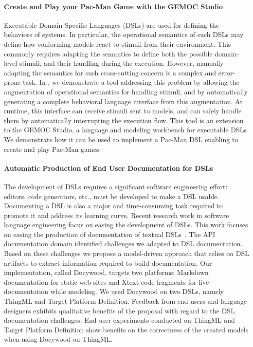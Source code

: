 \paragraph{Create and Play your Pac-Man Game with the GEMOC Studio}

Executable Domain-Specific Languages (DSLs) are used for defining the behaviors of systems. In particular, the
operational semantics of such DSLs may define how conforming
models react to stimuli from their environment. This commonly
requires adapting the semantics to define both the possible
domain-level stimuli, and their handling during the execution.
However, manually adapting the semantics for such cross-cutting
concern is a complex and error-prone task. In \cite{}, we
demonstrate a tool addressing this problem by allowing the
augmentation of operational semantics for handling stimuli, and
by automatically generating a complete behavioral language
interface from this augmentation. At runtime, this interface can receive stimuli sent to models, and can safely handle them by automatically interrupting the execution flow. This tool is an extension to the GEMOC Studio, a language and modeling
workbench for executable DSLs We demonstrate how it can be
used to implement a Pac-Man DSL enabling to create and play
Pac-Man games.



\paragraph{Automatic Production of End User Documentation for DSLs}

The development of DSLs requires a significant software engineering effort: editors, code generators, etc., must be developed to make a DSL usable. Documenting a DSL is also a major and time-consuming task required to promote it and address its learning curve. Recent research work in software language engineering focus on easing the development of DSLs. This work focuses on easing the production of documentation of textual DSLs~\cite{lemoulec:hal-01549042}. The API documentation domain identified challenges we adapted to DSL documentation. Based on these challenges we propose a model-driven approach that relies on DSL artifacts to extract information required to build documentation. Our implementation, called Docywood, targets two platforms: Markdown documentation for static web sites and Xtext code fragments for live documentation while modeling. We used Docywood on two DSLs, namely ThingML and Target Platform Definition. Feedback from end users and language designers exhibits qualitative benefits of the proposal with regard to the DSL documentation challenges. End user experiments conducted on ThingML and Target Platform Definition show benefits on the correctness of the created models when using Docywood on ThingML.